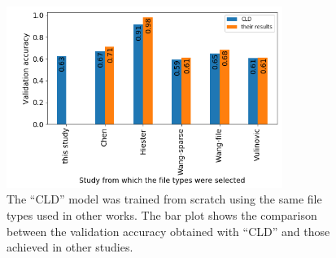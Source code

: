 \noindent
\begin{figure}[htb!]
\centering\includegraphics[width=0.8\textwidth]{content/CLD-others.png}
\caption[CLD vs. other studies]{\label{fig:cldothers}The ``CLD'' model was trained from scratch using the same file types used in other works. The bar plot shows the comparison between the validation accuracy obtained with ``CLD'' and those achieved in other studies.}%
\end{figure}

